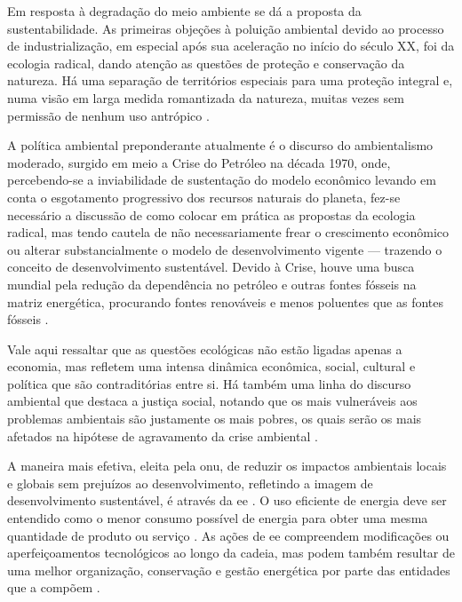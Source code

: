 Em resposta à degradação do meio ambiente se dá a proposta da
sustentabilidade. As primeiras objeções à poluição ambiental devido ao
processo de industrialização, em especial após sua aceleração no
início do século XX, foi da ecologia radical, dando atenção as
questões de proteção e conservação da natureza.  Há uma separação de
territórios especiais para uma proteção integral e, numa visão em
larga medida romantizada da natureza, muitas vezes sem permissão de
nenhum uso antrópico \cite{jatoba}.

A política ambiental preponderante atualmente é o discurso do
ambientalismo moderado, surgido em meio a Crise do Petróleo na década
1970, onde, percebendo-se a inviabilidade de sustentação do modelo
econômico levando em conta o esgotamento progressivo dos recursos
naturais do planeta, fez-se necessário a discussão de como colocar em
prática as propostas da ecologia radical, mas tendo cautela de não
necessariamente frear o crescimento econômico ou alterar
substancialmente o modelo de desenvolvimento vigente --- trazendo o
conceito de desenvolvimento sustentável. Devido à Crise, houve uma
busca mundial pela redução da dependência no petróleo e outras fontes
fósseis na matriz energética, procurando fontes renováveis e menos
poluentes que as fontes fósseis 
\cite{jatoba,epe_eficiencia_2012,rippel}. 

Vale aqui ressaltar que as questões ecológicas não estão ligadas
apenas a economia, mas refletem uma intensa dinâmica econômica,
social, cultural e política que são contraditórias entre si. Há também
uma linha do discurso ambiental que destaca a justiça social, notando
que os mais vulneráveis aos problemas ambientais são justamente os
mais pobres, os quais serão os mais afetados na hipótese de
agravamento da crise ambiental \cite{jatoba}.

A maneira mais efetiva, eleita pela \gls{onu}, de reduzir os impactos
ambientais locais e globais sem prejuízos ao desenvolvimento,
refletindo a imagem de desenvolvimento sustentável, é através da
\gls{ee} \cite{rippel,onu,dissert_cursino}. O uso eficiente de energia
deve ser entendido como o menor consumo possível de energia para obter
uma mesma quantidade de produto ou serviço \cite{pne30_eff_energ}.  As
ações de \gls{ee} compreendem modificações ou aperfeiçoamentos
tecnológicos ao longo da cadeia, mas podem também resultar de uma
melhor organização, conservação e gestão energética por parte das
entidades que a compõem \cite{pnef}. 

